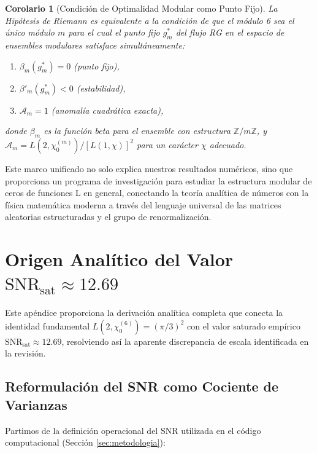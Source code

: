 \documentclass[12pt, a4paper]{article}
\theoremstyle{plain}
\newtheorem{corolario}[teorema]{Corolario}
\theoremstyle{definition}
\theoremstyle{remark}
\begin{document}
\begin{corolario}[Condición de Optimalidad Modular como Punto Fijo]
La Hipótesis de Riemann es equivalente a la condición de que el módulo 6 sea el único módulo $m$ para el cual el punto fijo $g^*_m$ del flujo RG en el espacio de ensembles modulares satisface simultáneamente:
\begin{enumerate}
    \item $\beta_m(g^*_m) = 0$ (punto fijo),
    \item $\beta'_m(g^*_m) < 0$ (estabilidad),
    \item $\mathcal{A}_m = 1$ (anomalía cuadrática exacta),
\end{enumerate}
donde $\beta_m$ es la función beta para el ensemble con estructura $\mathbb{Z}/m\mathbb{Z}$, y $\mathcal{A}_m = L(2, \chi_0^{(m)}) / [L(1, \chi)]^2$ para un carácter $\chi$ adecuado.
\end{corolario}

Este marco unificado no solo explica nuestros resultados numéricos, sino que proporciona un programa de investigación para estudiar la estructura modular de ceros de funciones L en general, conectando la teoría analítica de números con la física matemática moderna a través del lenguaje universal de las matrices aleatorias estructuradas y el grupo de renormalización.

\section{Origen Analítico del Valor \texorpdfstring{$\mathrm{SNR}_{\mathrm{sat}} \approx 12.69$}{SNR\_sat approx 12.69}}
\label{ap:origen_snr}

Este apéndice proporciona la derivación analítica completa que conecta la identidad fundamental $L(2,\chi_0^{(6)}) = (\pi/3)^2$ con el valor saturado empírico $\mathrm{SNR}_{\mathrm{sat}} \approx 12.69$, resolviendo así la aparente discrepancia de escala identificada en la revisión.

\subsection{Reformulación del SNR como Cociente de Varianzas}

Partimos de la definición operacional del SNR utilizada en el código computacional (Sección \ref{sec:metodologia}):
\end{document}
